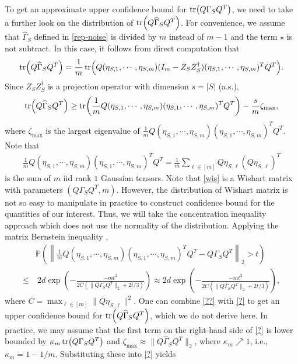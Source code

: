 \documentclass[11pt,a4paper]{amsart}
\numberwithin{equation}{section}
\theoremstyle{plain}
\theoremstyle{definition}
\def\P{{\mathbb P}}
\begin{document}
To get an approximate upper confidence bound for $\tr(Q\Gamma_SQ^T)$, we need to take a further look on the distribution of $\tr(Q\widehat{\Gamma}_SQ^T)$. For convenience, we assume that $\widehat{\Gamma}_S$ defined in \eqref{rep-noise} is divided by $m$ instead of $m-1$ and the term $\star$ is not subtract. 
In this case, it follows from direct computation that
\begin{align}
\tr(Q\widehat{\Gamma}_SQ^T) = \frac{1}{m}\tr(Q(\eta_{S,1}, \cdots, \eta_{S,m})(I_m - Z_SZ_S^\dagger)(\eta_{S,1}, \cdots, \eta_{S,m})^TQ^T).\label{rr}
\end{align}
Since $Z_SZ_S^\dagger$ is a projection operator with dimension $s=|S|$ (a.s.), 
\begin{align}
\tr(Q\widehat{\Gamma}_SQ^T) \geq \tr(\frac{1}{m}Q(\eta_{S,1}, \cdots, \eta_{S,m})(\eta_{S,1}, \cdots, \eta_{S,m})^TQ^T)-\frac{s}{m}\zeta_{\max},\label{?}
\end{align}
where $\zeta_{\max}$ is the largest eigenvalue of $\frac{1}{m}Q(\eta_{S,1}, \cdots, \eta_{S,m})(\eta_{S,1}, \cdots, \eta_{S,m})^TQ^T$. 
Note that 
\begin{align}
 \frac{1}{m}Q(\eta_{S,1}, \cdots, \eta_{S,m})(\eta_{S,1}, \cdots, \eta_{S,m})^TQ^T = \frac{1}{m}\sum_{\ell\in [m]}Q\eta_{S,\ell}(Q\eta_{S,\ell})^T\label{wis}
\end{align}
is the sum of $m$ iid rank $1$ Gaussian tensors. 
Note that \eqref{wis} is a Wishart matrix with parameters $(Q\Gamma_SQ^T, m)$. 
However, the distribution of Wishart matrix is not so easy to manipulate in practice to construct confidence bound for the quantities of our interest. Thus, we will take the concentration inequality approach which does not use the normality of the distribution.
Applying the matrix Bernstein inequality \cite{Tropp_2011},  
\begin{align}
&\P\left(\left\| \frac{1}{m}Q(\eta_{S,1}, \cdots, \eta_{S,m})(\eta_{S,1}, \cdots, \eta_{S,m})^TQ^T-Q\Gamma_SQ^T\right\|_2>t\right)\nonumber\\
\leq&\  2d \exp\left(-\frac{-mt^2}{2C(\|Q\Gamma_SQ^T\|_2+2t/3)}\right)\approx 2d \exp\left(-\frac{-mt^2}{2C(\|Q\widehat{\Gamma}_SQ^T\|_2+2t/3)}\right)\label{??},
\end{align}
where $C = \max_{\ell\in [m]} \|Q\eta_{S,\ell}\|^2$. 
One can combine \eqref{??} with \eqref{?} to get an upper confidence bound for $\tr(Q\widehat{\Gamma}_SQ^T)$, which we do not derive here.  
In practice, we may assume that the first term on the right-hand side of \eqref{?} is lower bounded by $\kappa_m\tr(Q\Gamma_SQ^T)$ and $\zeta_{\max}\approx \|Q\widehat{\Gamma}_SQ^T\|_2$, where $\kappa_m\nearrow 1$, i.e., $\kappa_m = 1-1/m$. Substituting these into \eqref{?} yields
\end{document}
